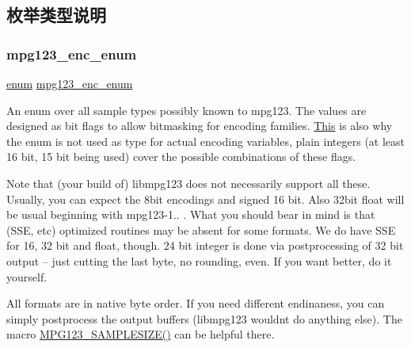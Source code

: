 \subsection{枚举类型说明}
\mbox{\label{group__mpg123__enc_gafc8cdd60a8d3c30a09249869d835c634}} 
\subsubsection{\texorpdfstring{mpg123\+\_\+enc\+\_\+enum}{mpg123\_enc\_enum}}
{\footnotesize\ttfamily \hyperlink{interfaceenum}{enum} \hyperlink{group__mpg123__enc_gafc8cdd60a8d3c30a09249869d835c634}{mpg123\+\_\+enc\+\_\+enum}}

An enum over all sample types possibly known to mpg123. The values are designed as bit flags to allow bitmasking for encoding families. \hyperlink{namespace_this}{This} is also why the enum is not used as type for actual encoding variables, plain integers (at least 16 bit, 15 bit being used) cover the possible combinations of these flags.

Note that (your build of) libmpg123 does not necessarily support all these. Usually, you can expect the 8bit encodings and signed 16 bit. Also 32bit float will be usual beginning with mpg123-\/1.. . What you should bear in mind is that (S\+SE, etc) optimized routines may be absent for some formats. We do have S\+SE for 16, 32 bit and float, though. 24 bit integer is done via postprocessing of 32 bit output -- just cutting the last byte, no rounding, even. If you want better, do it yourself.

All formats are in native byte order. If you need different endinaness, you can simply postprocess the output buffers (libmpg123 wouldn\textquotesingle{}t do anything else). The macro \hyperlink{group__mpg123__enc_gafa4071cca43ad223f5f2aea092b1b045}{M\+P\+G123\+\_\+\+S\+A\+M\+P\+L\+E\+S\+I\+Z\+E()} can be helpful there. 
